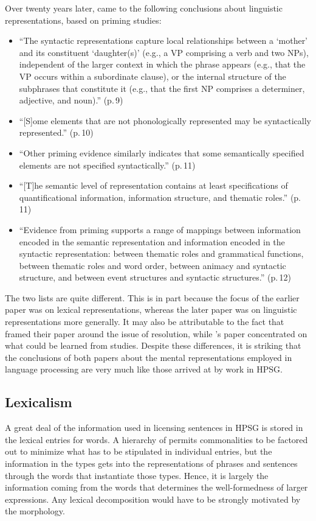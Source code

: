 \documentclass[output=paper
                ,modfonts
                ,nonflat
	        ,collection
	        ,collectionchapter
	        ,collectiontoclongg
 	        ,biblatex
                ,babelshorthands
                ,newtxmath
                ,draftmode
                ,colorlinks, citecolor=brown
]{./langsci/langscibook}
\begin{document}
Over twenty years later, \citet{BraniganPickering2017} came to the following conclusions about linguistic representations, based on priming studies:
\begin{itemize}
\item ``The syntactic representations capture local relationships
between a `moth\-er' and its constituent `daughter(s)' (e.g.,
a VP comprising a verb and two NPs), independent of the
larger context in which the phrase appears (e.g., that the VP
occurs within a subordinate clause), or the internal structure
of the subphrases that constitute it (e.g., that the
first NP comprises a determiner, adjective, and noun).'' (p.\,9)
\item ``[S]ome elements that are not phonologically represented may
be syntactically represented.'' (p.\,10)
\item ``Other priming evidence similarly indicates that some
semantically specified elements are not specified syntactically.'' (p.\,11)
\item ``[T]he semantic level of representation
contains at least specifications of quantificational information,
information structure, and thematic roles.'' (p.\,11)
\item ``Evidence
from priming supports a range of mappings between information encoded in the semantic representation and information encoded in the syntactic representation: between
thematic roles and grammatical functions, between thematic roles and word order, between animacy and syntactic
structure, and between event structures and syntactic
structures.'' (p.\,12)
\end{itemize}
The two lists are quite different.  This is in part because the focus of the earlier paper was on lexical representations, whereas the later paper was on linguistic representations more generally.  It may also be attributable to the fact that \citeauthor{MPS94a-u} framed their paper around the issue of  resolution, while \citeauthor{BraniganPickering2017}'s paper concentrated on what could be learned from  studies.  Despite these differences, it is striking that the conclusions of both papers about the mental representations employed in language processing are very much like those arrived at by work in HPSG.

\subsection{Lexicalism}

A great deal of the information used in licensing sentences in HPSG is stored in the lexical entries for words.  A hierarchy of  permits commonalities to be factored out to minimize what has to be stipulated in individual entries, but the information in the types gets into the representations of phrases and sentences through the words that instantiate those types. Hence, it is largely the information coming from the words that determines the well-formedness of larger expressions.  Any lexical decomposition would have to be strongly motivated by the morphology.
\end{document}
